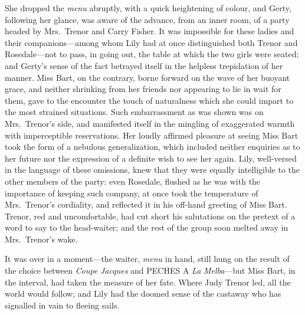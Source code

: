 \documentclass[12pt,a4paper]{book}
\begin{document}
She dropped the \textit{menu} abruptly, with a quick heightening of
colour, and Gerty, following her glance, was aware of the
advance, from an inner room, of a party headed by Mrs.\ Trenor and
Carry Fisher. It was impossible for these ladies and their
companions---among whom Lily had at once distinguished both Trenor
and Rosedale---not to pass, in going out, the table at which the
two girls were seated; and Gerty's sense of the fact betrayed
itself in the helpless trepidation of her manner. Miss Bart, on
the contrary, borne forward on the wave of her buoyant grace, and
neither shrinking from her friends nor appearing to lie in wait
for them, gave to the encounter the touch of naturalness
which she could impart to the most strained situations. Such
embarrassment as was shown was on Mrs.\ Trenor's side, and
manifested itself in the mingling of exaggerated warmth with
imperceptible reservations. Her loudly affirmed pleasure at
seeing Miss Bart took the form of a nebulous generalization,
which included neither enquiries as to her future nor the
expression of a definite wish to see her again. Lily, well-versed
in the language of these omissions, knew that they were equally
intelligible to the other members of the party: even Rosedale,
flushed as he was with the importance of keeping such company, at
once took the temperature of Mrs.\ Trenor's cordiality, and
reflected it in his off-hand greeting of Miss Bart. Trenor, red
and uncomfortable, had cut short his salutations on the pretext
of a word to say to the head-waiter; and the rest of the group
soon melted away in Mrs.\ Trenor's wake.





It was over in a moment---the waiter, \textit{menu} in hand, still hung on
the result of the choice between \textit{Coupe} \textit{Jacques} and PECHES A \textit{La}
\textit{Melba}---but Miss Bart, in the interval, had taken the measure of
her fate. Where Judy Trenor led, all the world would follow; and
Lily had the doomed sense of the castaway who has signalled in
vain to fleeing sails.
\end{document}

